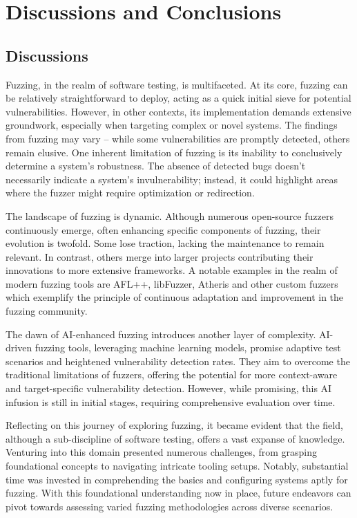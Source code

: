 \vspace{21.5pt}
\chapter{Discussions and Conclusions}

\section{Discussions}
Fuzzing, in the realm of software testing, is multifaceted. At its core,
fuzzing can be relatively straightforward to deploy, acting as a quick initial
sieve for potential vulnerabilities. However, in other contexts, its
implementation demands extensive groundwork, especially when targeting
complex or novel systems. The findings from fuzzing may vary – while some
vulnerabilities are promptly detected, others remain elusive. One inherent
limitation of fuzzing is its inability to conclusively determine a system's robustness.
The absence of detected bugs doesn't necessarily indicate a system's invulnerability;
instead, it could highlight areas where the fuzzer might require optimization or redirection.

The landscape of fuzzing is dynamic. Although numerous open-source fuzzers
continuously emerge, often enhancing specific components of fuzzing,
their evolution is twofold. Some lose traction, lacking the maintenance to
remain relevant. In contrast, others merge into larger projects
contributing their innovations to more extensive frameworks.
A notable examples in the realm of modern fuzzing tools are AFL++, libFuzzer, Atheris and other
custom fuzzers which exemplify the principle of continuous adaptation and improvement
in the fuzzing community.

The dawn of AI-enhanced fuzzing\cite{GoogleOn27:online} introduces another layer of complexity.
AI-driven fuzzing tools, leveraging machine learning models,
promise adaptive test scenarios and heightened vulnerability detection rates.
They aim to overcome the traditional limitations of fuzzers, offering the potential
for more context-aware and target-specific vulnerability detection.
However, while promising, this AI infusion is still in initial stages,
requiring comprehensive evaluation over time.

Reflecting on this journey of exploring fuzzing, it became evident
that the field, although a sub-discipline of software testing,
offers a vast expanse of knowledge. Venturing into this domain presented
numerous challenges, from grasping foundational concepts to navigating
intricate tooling setups. Notably, substantial time was invested in comprehending
the basics and configuring systems aptly for fuzzing. With this foundational
understanding now in place, future endeavors can pivot towards assessing varied
fuzzing methodologies across diverse scenarios.

